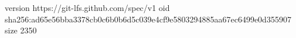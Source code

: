 version https://git-lfs.github.com/spec/v1
oid sha256:ad65e56bba3378cb0c6b0b6d5c039e4cf9e5803294885aa67ec6499e0d355907
size 2350
